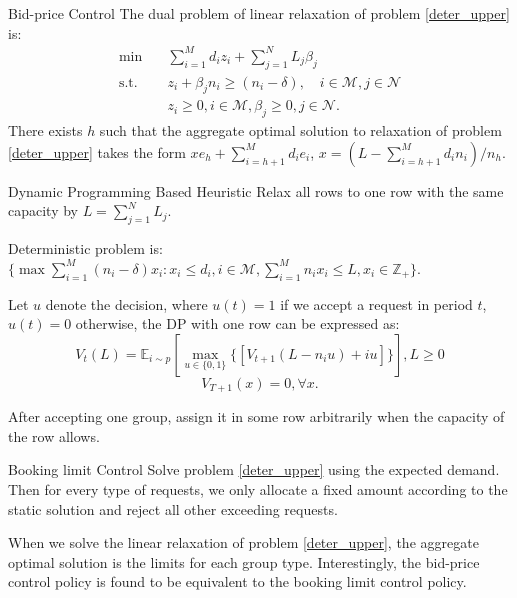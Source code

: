      \begin{frame}{Bid-price Control}
        The dual problem of linear relaxation of problem \eqref{deter_upper} is:
        \begin{equation}\label{bid-price_dual}
          \begin{aligned}
          \min \quad & \sum_{i=1}^{M} d_i z_i + \sum_{j= 1}^{N} L_j \beta_{j} \\
          \text {s.t.} \quad & z_{i} + \beta_j n_i \geq (n_i-\delta), \quad i \in \mathcal{M}, j \in \mathcal{N} \\
          & z_{i} \geq 0, i \in \mathcal{M}, \beta_{j} \geq 0, j \in \mathcal{N}.
          \end{aligned}
        \end{equation}
        \small There exists $h$ such that the aggregate optimal solution to relaxation of problem \eqref{deter_upper} takes the form $x e_{h} + \sum_{i=h+1} ^{M} d_{i} e_{i}$, $x = (L- \sum_{i = h+1}^{M} {d_i n_i})/ n_h$.

      \end{frame}

      \begin{frame}{Dynamic Programming Based Heuristic}
        Relax all rows to one row with the same capacity by $L = \sum_{j=1}^{N} L_j$.
        
        Deterministic problem is: $\{\max \sum_{i=1}^{M} (n_i- \delta) x_{i}: x_{i} \leq d_{i}, i \in \mathcal{M}, \sum_{i=1}^{M} n_{i} x_{i} \leq L, x_{i} \in \mathbb{Z}_{+}\}$.
        
        Let $u$ denote the decision, where $u(t) = 1$ if we accept a request in period $t$, $u(t) =0$ otherwise, the DP with one row can be expressed as:
        $$V_{t}(L) = \mathbb{E}_{i \sim p} [\max_{u \in \{0,1\}} \{ {[V_{t+1}(L-n_i u)+ i u]}\}], L \geq 0$$ 
        $$V_{T+1}(x) =0, \forall x.$$

        After accepting one group, assign it in some row arbitrarily when the capacity of the row allows.
      \end{frame}
      
      \begin{frame}{Booking limit Control}
        Solve problem \eqref{deter_upper} using the expected demand. Then for every type of requests, we only allocate a fixed amount according to the static solution and reject all other exceeding requests.
        \vspace*{1cm}
        
        When we solve the linear relaxation of problem \eqref{deter_upper}, the aggregate optimal solution is the limits for each group type. Interestingly, the bid-price control policy is found to be equivalent to the booking limit control policy.
      \end{frame}